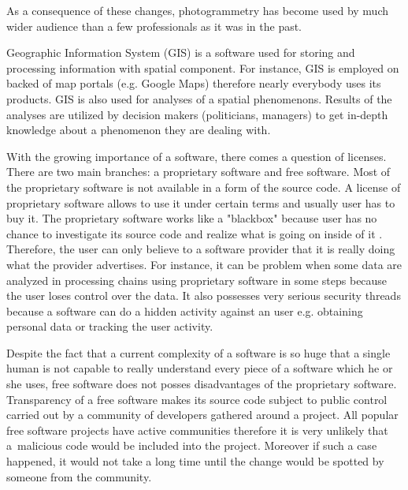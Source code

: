 \documentclass[a4paper,12pt]{article}
\begin{document}
As a consequence of these changes, photogrammetry has 
become used by much wider audience than a few professionals as it was in the past. 


Geographic Information System (GIS) is a software used for storing and processing information
with spatial component. For instance,  GIS is employed on backed of map portals (e.g. Google Maps) therefore nearly 
everybody uses its products. 
GIS is also used  for analyses of a spatial phenomenons.
Results of the analyses are utilized by decision makers (politicians, managers) 
to get in-depth knowledge about a 
phenomenon they are dealing with.



With the growing importance of a software, there comes a question of licenses. There are two 
main branches: a proprietary software and free software. Most of the proprietary software is not available in 
a form of the source code. A license of proprietary software allows to use it under certain terms and usually user 
has to buy it. The proprietary software works like a "blackbox" because user has no chance to investigate its source 
code and realize what is going on inside of it \cite{rocchini2012let}. Therefore, the user can only believe to a software provider
that it is really doing what the provider advertises. 
For instance, it can be problem when some data are analyzed in processing chains using proprietary software in some steps
because the user loses control over the data.
It also possesses very serious security threads because a software can do a hidden activity against an user
e.g. obtaining personal data or tracking the user activity.



Despite the fact that a current complexity of a software is so huge
that a single human is not capable to really understand every piece of a software which he or she uses,
free software does not posses disadvantages of the proprietary software.
Transparency of a free software makes its source code subject to public control 
carried out by a community of developers gathered around a project.
All popular free software projects have active communities therefore it is
very unlikely that a~malicious code would be included into the project.
Moreover if such a case happened, it would not take a long time until the change 
would be spotted by someone from the community.
\end{document}
